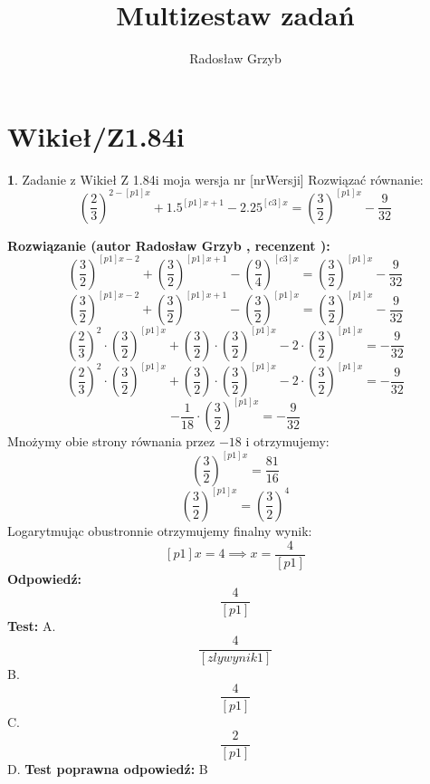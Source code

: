 \documentclass[12pt, a4paper]{article}
\title{Multizestaw zadań}
\author{Radosław Grzyb}
\date{}
\theoremstyle{definition} %
\newtheorem{zad}{}
\newcommand{\kategoria}[1]{\section{#1}} %
\newcommand{\zadStart}[1]{\begin{zad}#1\newline} %
\newcommand{\zadStop}{\end{zad}}   %
\newcommand{\rozwStart}[2]{\noindent \textbf{Rozwiązanie (autor #1 , recenzent #2): }\newline} %
\newcommand{\rozwStop}{\newline}                                            %
\newcommand{\odpStart}{\noindent \textbf{Odpowiedź:}\newline}    %
\newcommand{\odpStop}{\newline}                                             %
\newcommand{\testStart}{\noindent \textbf{Test:}\newline} %
\newcommand{\testStop}{\newline} %
\newcommand{\kluczStart}{\noindent \textbf{Test poprawna odpowiedź:}\newline} %
\newcommand{\kluczStop}{\newline} %
\begin{document}
\maketitle
\kategoria{Wikieł/Z1.84i}
\zadStart{Zadanie z Wikieł Z 1.84i moja wersja nr [nrWersji]}
Rozwiązać równanie:
$$\left(\frac{2}{3}\right)^{2-[p1]x}+1.5^{[p1]x+1}-2.25^{[c3]x}=\left(\frac{3}{2}\right)^{[p1]x}-\frac{9}{32}$$
\zadStop
\rozwStart{Radosław Grzyb}{}
$$\left(\frac{3}{2}\right)^{[p1]x-2}+\left(\frac{3}{2}\right)^{[p1]x+1}-\left(\frac{9}{4}\right)^{[c3]x}=\left(\frac{3}{2}\right)^{[p1]x}-\frac{9}{32}$$
$$\left(\frac{3}{2}\right)^{[p1]x-2}+\left(\frac{3}{2}\right)^{[p1]x+1}-\left(\frac{3}{2}\right)^{[p1]x}=\left(\frac{3}{2}\right)^{[p1]x}-\frac{9}{32}$$
$$\left(\frac{2}{3}\right)^{2}\cdot\left(\frac{3}{2}\right)^{[p1]x}+\left(\frac{3}{2}\right)\cdot\left(\frac{3}{2}\right)^{[p1]x}-2\cdot\left(\frac{3}{2}\right)^{[p1]x}=-\frac{9}{32}$$
$$\left(\frac{2}{3}\right)^{2}\cdot\left(\frac{3}{2}\right)^{[p1]x}+\left(\frac{3}{2}\right)\cdot\left(\frac{3}{2}\right)^{[p1]x}-2\cdot\left(\frac{3}{2}\right)^{[p1]x}=-\frac{9}{32}$$
$$-\frac{1}{18}\cdot\left(\frac{3}{2}\right)^{[p1]x}=-\frac{9}{32}$$
Mnożymy obie strony równania przez $-18$ i otrzymujemy:
$$\left(\frac{3}{2}\right)^{[p1]x}=\frac{81}{16}$$
$$\left(\frac{3}{2}\right)^{[p1]x}=\left(\frac{3}{2}\right)^{4}$$
Logarytmując obustronnie otrzymujemy finalny wynik:
$$[p1]x=4\implies x=\frac{4}{[p1]}$$
\rozwStop
\odpStart
$$\frac{4}{[p1]}$$
\odpStop
\testStart
A.$$\frac{4}{[zlywynik1]}$$
B.$$\frac{4}{[p1]}$$
C.$$\frac{2}{[p1]}$$
D$.$$$
\testStop
\kluczStart
B
\kluczStop
\end{document}
